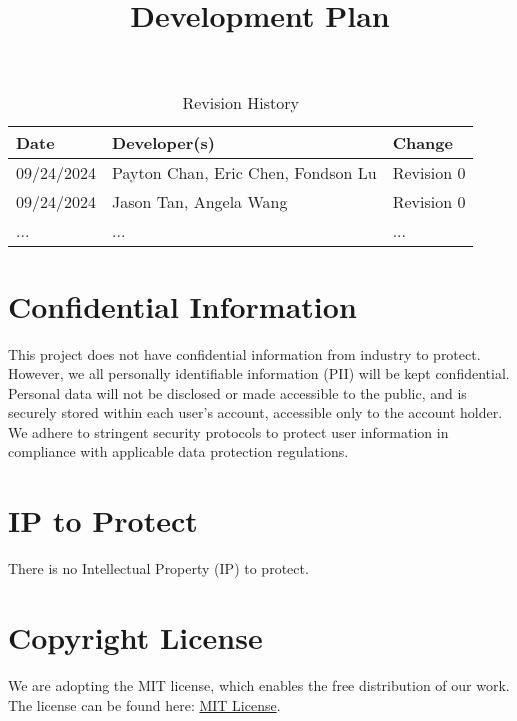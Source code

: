 \documentclass{article}
\title{Development Plan\\\progname}
\date{}
\begin{document}
\maketitle

\begin{table}[hp]
\caption{Revision History} \label{TblRevisionHistory}
\begin{tabularx}{\textwidth}{llX}
\toprule
\textbf{Date} & \textbf{Developer(s)} & \textbf{Change}\\
\midrule
09/24/2024 & Payton Chan, Eric Chen, Fondson Lu & Revision 0\\
09/24/2024 & Jason Tan, Angela Wang & Revision 0\\
... & ... & ...\\
\bottomrule
\end{tabularx}
\end{table}

\newpage{}




\section{Confidential Information}
This project does not have confidential information from industry to protect.
However, we all personally identifiable information (PII) will be kept
confidential. Personal data will not be disclosed or made accessible to the
public, and is securely stored within each user's account, accessible only to
the account holder. We adhere to stringent security protocols to protect user
information in compliance with applicable data protection regulations.

\section{IP to Protect}
There is no Intellectual Property (IP) to protect.

\section{Copyright License}
We are adopting the MIT license, which enables the free distribution of our
work. The license can be found here:
\href{https://github.com/PlutosCapstone/Plutos/blob/main/LICENSE}{MIT License}.
\end{document}
